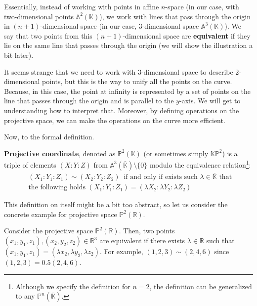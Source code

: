 \documentclass[../lecture-notes.tex]{subfiles}
\begin{document}
Essentially, instead of working with points in affine $n$-space (in our case, with two-dimensional points $\mathbb{A}^2(\mathbb{K})$), we work with lines that pass through the origin in 
$(n+1)$-dimensional space (in our case, 3-dimensional space $\mathbb{A}^3(\mathbb{K})$). We say that two points from this $(n+1)$-dimensional space are \textbf{equivalent} if they lie on the same line that passes through the origin (we will show the illustration a bit later). 

It seems strange that we need to work with 3-dimensional space to describe 2-dimensional points, but this is the way to unify all the points on the curve. Because, in this case, the point at infinity is represented by a set of points on the line that passes through the origin and is parallel to the
$y$-axis. We will get to understanding how to interpret that. Moreover, by defining operations on the projective space, we can make the operations on the curve more efficient.

Now, to the formal definition.

\begin{definition}
    \textbf{Projective coordinate}, denoted as $\mathbb{P}^2(\mathbb{K})$ (or sometimes simply $\mathbb{K}\mathbb{P}^2$) is a triple of elements $(X:Y:Z)$ from $\mathbb{A}^3(\overline{\mathbb{K}}) \setminus \{0\}$ modulo the equivalence relation\footnote{Although we specify the definition for $n=2$, the definition can be generalized to any $\mathbb{P}^n(\overline{\mathbb{K}})$.}:
    \begin{equation*}
        \begin{aligned}
            &(X_1:Y_1:Z_1) \sim (X_2:Y_2:Z_2) \;\; \text{if and only if exists such } \lambda \in \overline{\mathbb{K}} \text{ that } \\ 
            &\text{the following holds } (X_1:Y_1:Z_1) = (\lambda X_2: \lambda Y_2: \lambda Z_2)            
        \end{aligned}
    \end{equation*}
\end{definition}

This definition on itself might be a bit too abstract, so let us consider the concrete example for projective space $\mathbb{P}^2(\mathbb{R})$.

\begin{example}
    Consider the projective space $\mathbb{P}^2(\mathbb{R})$. Then, two points $(x_1,y_1,z_1),(x_2,y_2,z_2) \in \mathbb{R}^3$ are equivalent if there exists $\lambda \in \mathbb{R}$ such that $(x_1,y_1,z_1) = (\lambda x_2, \lambda y_2, \lambda z_2)$. For example, $(1,2,3) \sim (2,4,6)$ since $(1,2,3) = 0.5(2,4,6)$.
\end{example}
\end{document}
